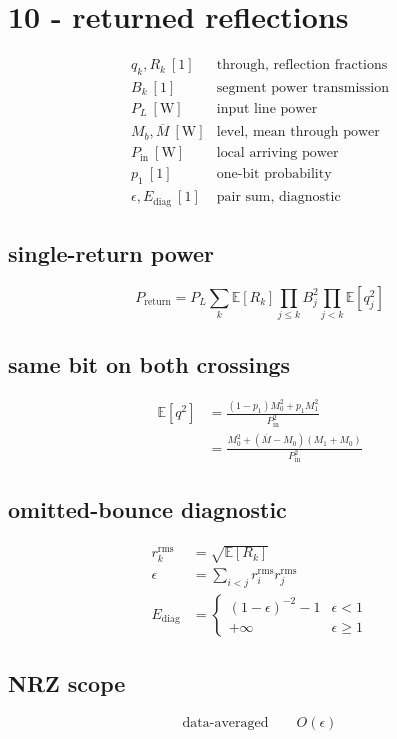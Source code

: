 \section*{10 - returned reflections}

\[
\begin{array}{ll}q_k,R_k\ [1]&\text{through, reflection fractions}\\[0.6em]B_k\ [1]&\text{segment power transmission}\\[0.6em]P_L\ [\mathrm W]&\text{input line power}\\[0.6em]M_b,\overline M\ [\mathrm W]&\text{level, mean through power}\\[0.6em]P_{\mathrm{in}}\ [\mathrm W]&\text{local arriving power}\\[0.6em]p_1\ [1]&\text{one-bit probability}\\[0.6em]\epsilon,E_{\mathrm{diag}}\ [1]&\text{pair sum, diagnostic}\end{array}
\]

\subsection*{single-return power}
\[
\displaystyle P_{\mathrm{return}}=P_L\sum_k\mathbb E[R_k]\prod_{j\le k}B_j^2\prod_{j<k}\mathbb E[q_j^2]
\]

\subsection*{same bit on both crossings}
\[
\displaystyle \begin{aligned}\mathbb E[q^2]&=\frac{(1-p_1)M_0^2+p_1M_1^2}{P_{\mathrm{in}}^2}\\&=\frac{M_0^2+(\overline M-M_0)(M_1+M_0)}{P_{\mathrm{in}}^2}\end{aligned}
\]

\subsection*{omitted-bounce diagnostic}
\[
\displaystyle \begin{aligned}r_k^{\mathrm{rms}}&=\sqrt{\mathbb E[R_k]}\\\epsilon&=\sum_{i<j}r_i^{\mathrm{rms}}r_j^{\mathrm{rms}}\\E_{\mathrm{diag}}&=\begin{cases}(1-\epsilon)^{-2}-1&\epsilon<1\\+\infty&\epsilon\ge1\end{cases}\end{aligned}
\]

\subsection*{NRZ scope}
\[
\displaystyle \text{data-averaged}\qquad O(\epsilon)
\]
